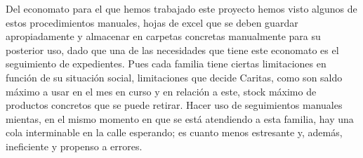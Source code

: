 \vspace{1em}
\par Del economato para el que hemos trabajado este proyecto hemos visto algunos de estos procedimientos manuales, hojas de excel que se deben guardar apropiadamente y almacenar en carpetas concretas manualmente para su posterior uso, dado que una de las necesidades que tiene este economato es el seguimiento de expedientes. Pues cada familia tiene ciertas limitaciones en función de su situación social, limitaciones que decide Caritas, como son saldo máximo a usar en el mes en curso y en relación a este, stock máximo de productos concretos que se puede retirar. Hacer uso de seguimientos manuales mientas, en el mismo momento en que se está atendiendo a esta familia, hay una cola interminable en la calle esperando; es cuanto menos estresante y, además, ineficiente y propenso a errores.
\vspace{1em}
 
